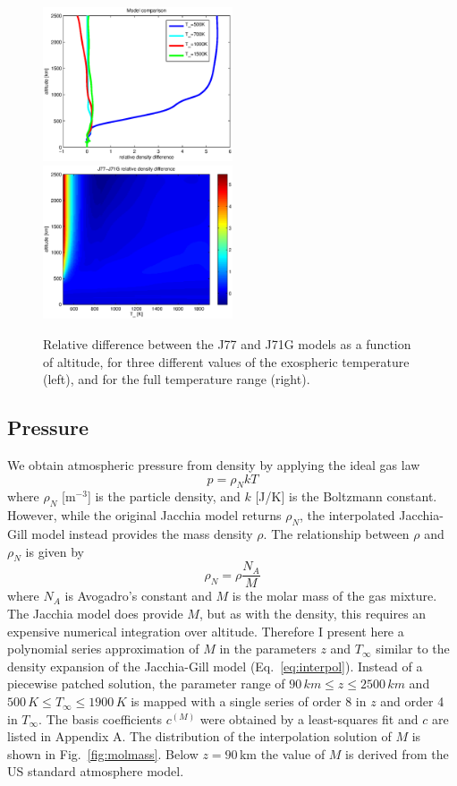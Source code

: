 \documentclass[a4paper]{article}
\begin{document}
\begin{figure}
\includegraphics[width=0.5\textwidth]{dens_relerr.eps}
\includegraphics[width=0.5\textwidth]{dens_relerr2.eps}
\caption{Relative difference between the J77 and J71G models as a function of altitude, for three different values of the exospheric temperature (left), and for the full temperature range (right).}
\label{fig:denserr}
\end{figure}

\subsection{Pressure}
 
We obtain atmospheric pressure from density by applying the ideal gas law
\begin{equation}
p = \rho_N k T
\end{equation}
where $\rho_N$ [m$^{-3}$] is the particle density, and $k$ [J/K] is the Boltzmann constant. However, while the original Jacchia model returns $\rho_N$, the interpolated Jacchia-Gill model instead provides the mass density $\rho$. The relationship between $\rho$ and $\rho_N$ is given by
\begin{equation}
\rho_N = \rho \frac{N_A}{M}
\end{equation}
where $N_A$ is Avogadro's constant and $M$ is the molar mass of the gas mixture. The Jacchia model does provide $M$, but as with the density, this requires an expensive numerical integration over altitude. Therefore I present here a polynomial series approximation of $M$ in the parameters $z$ and $T_\infty$ similar to the density expansion of the Jacchia-Gill model (Eq.~\ref{eq:interpol}). Instead of a piecewise patched solution, the parameter range of $90\,km \leq z \leq 2500\,km$ and $500\,K \leq T_\infty \leq 1900\,K$ is mapped with a single series of order 8 in $z$ and order 4 in $T_\infty$. The basis coefficients $c^{(M)}$ were obtained by a least-squares fit and $c$ are listed in Appendix A. The distribution of the interpolation solution of $M$ is shown in Fig.~\ref{fig:molmass}. Below $z=90$\,km the value of $M$ is derived from the US standard atmosphere model.
\end{document}
